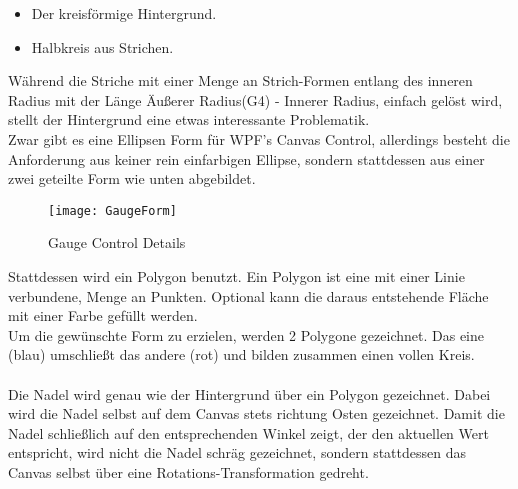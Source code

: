 \begin{itemize}
	\item Der kreisförmige Hintergrund.
	\item Halbkreis aus Strichen.
\end{itemize}
Während die Striche mit einer Menge an Strich-Formen entlang des inneren Radius mit der Länge Äußerer Radius(G4) - Innerer Radius, einfach gelöst wird, stellt der Hintergrund eine etwas interessante Problematik.\\
Zwar gibt es eine Ellipsen Form für WPF's Canvas Control, allerdings besteht die Anforderung aus keiner rein einfarbigen Ellipse, sondern stattdessen aus einer zwei geteilte Form wie unten abgebildet.
\begin{figure}[ht]
	\centering
	\texttt{[image: GaugeForm]}
	\caption{Gauge Control Details}
	\label{fig:gauge}
\end{figure}
Stattdessen wird ein Polygon benutzt. Ein Polygon ist eine mit einer Linie verbundene, Menge an Punkten. Optional kann die daraus entstehende Fläche mit einer Farbe gefüllt werden.\\
Um die gewünschte Form zu erzielen, werden 2 Polygone gezeichnet. Das eine (blau) umschließt das andere (rot) und bilden zusammen einen vollen Kreis.\\
\\
Die Nadel wird genau wie der Hintergrund über ein Polygon gezeichnet. Dabei wird die Nadel selbst auf dem Canvas stets richtung Osten gezeichnet. Damit die Nadel schließlich auf den entsprechenden Winkel zeigt, der den aktuellen Wert entspricht, wird nicht die Nadel schräg gezeichnet, sondern stattdessen das Canvas selbst über eine Rotations-Transformation gedreht.
